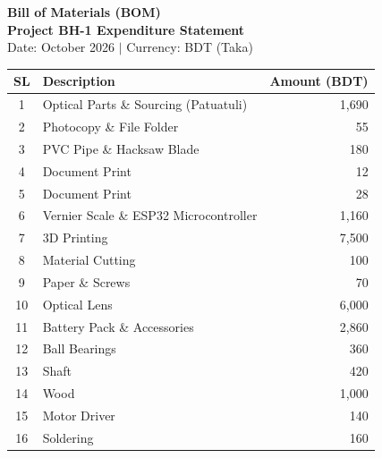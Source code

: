 \documentclass[11pt,a4paper]{article}
\begin{document}
\begin{center}
    {\LARGE \textbf{Bill of Materials (BOM)}}\\[1.5ex]
    {\large \textbf{Project BH-1 Expenditure Statement}}\\[1ex]
    \normalsize Date: October 2026 \quad $\vert$ \quad Currency: BDT (Taka)
\end{center}

\vspace{2ex}

\noindent
\renewcommand{\arraystretch}{1.18}
\begin{tabularx}{\linewidth}{@{} c X r @{}}
\toprule
\textbf{SL} & \textbf{Description} & \textbf{Amount (BDT)} \\
\midrule
1  & Optical Parts \& Sourcing (Patuatuli)                        & 1,690 \\
2  & Photocopy \& File Folder                                     & 55 \\
3  & PVC Pipe \& Hacksaw Blade                                    & 180 \\
4  & Document Print                                               & 12 \\
5  & Document Print                                               & 28 \\
6  & Vernier Scale \& ESP32 Microcontroller                       & 1,160 \\
7  & 3D Printing                                                  & 7,500 \\
8  & Material Cutting                                             & 100 \\
9  & Paper \& Screws                                              & 70 \\
10 & Optical Lens                                                 & 6,000 \\
11 & Battery Pack \& Accessories                                  & 2,860 \\
12 & Ball Bearings                                                & 360 \\
13 & Shaft                                                        & 420 \\
14 & Wood                                                         & 1,000 \\
15 & Motor Driver                                                 & 140 \\
16 & Soldering                                        & 160 \\

\end{tabularx}
\end{document}
